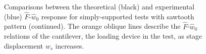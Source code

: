 \begin{figure}[H]
\caption{Comparisons between the theoretical (black) and experimental (blue) $\hat{F}$-$\hat{w}_0$ response for simply-supported tests with sawtooth pattern (continued). The orange oblique lines describe the $\hat{F}$-$\hat{w}_0$ relations of the cantilever, the loading device in the test, as stage displacement $w_s$ increases.}
\end{figure}




\clearpage

